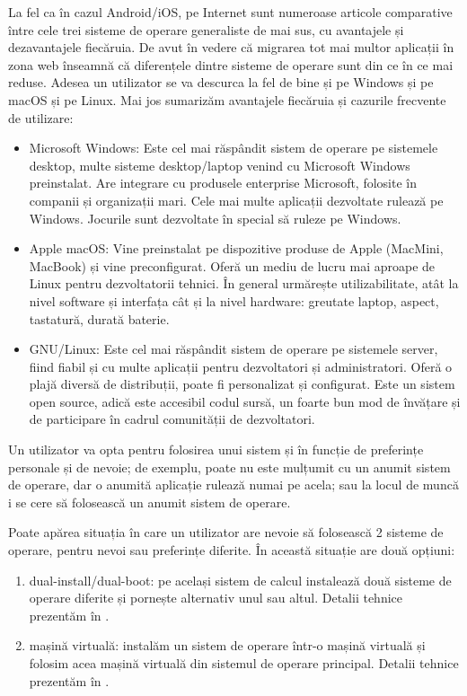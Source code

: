 La fel ca în cazul Android/iOS, pe Internet sunt numeroase articole comparative între cele trei sisteme de operare generaliste de mai sus, cu avantajele și dezavantajele fiecăruia. De avut în vedere că migrarea tot mai multor aplicații în zona web înseamnă că diferențele dintre sisteme de operare sunt din ce în ce mai reduse. Adesea un utilizator se va descurca la fel de bine și pe Windows și pe macOS și pe Linux. Mai jos sumarizăm avantajele fiecăruia și cazurile frecvente de utilizare:

\begin{itemize}
  \item Microsoft Windows: Este cel mai răspândit sistem de operare pe sistemele desktop, multe sisteme desktop/laptop venind cu Microsoft Windows preinstalat. Are integrare cu produsele enterprise Microsoft, folosite în companii și organizații mari. Cele mai multe aplicații dezvoltate rulează pe Windows. Jocurile sunt dezvoltate în special să ruleze pe Windows.
  \item Apple macOS: Vine preinstalat pe dispozitive produse de Apple (MacMini, MacBook) și vine preconfigurat. Oferă un mediu de lucru mai aproape de Linux pentru dezvoltatorii tehnici. În general urmărește utilizabilitate, atât la nivel software și interfața cât și la nivel hardware: greutate laptop, aspect, tastatură, durată baterie.
  \item GNU/Linux: Este cel mai răspândit sistem de operare pe sistemele server, fiind fiabil și cu multe aplicații pentru dezvoltatori și administratori. Oferă o plajă diversă de distribuții, poate fi personalizat și configurat. Este un sistem open source, adică este accesibil codul sursă, un foarte bun mod de învățare și de participare în cadrul comunității de dezvoltatori.
\end{itemize}

Un utilizator va opta pentru folosirea unui sistem și în funcție de preferințe personale și de nevoie; de exemplu, poate nu este mulțumit cu un anumit sistem de operare, dar o anumită aplicație rulează numai pe acela; sau la locul de muncă i se cere să folosească un anumit sistem de operare.

Poate apărea situația în care un utilizator are nevoie să folosească 2 sisteme de operare, pentru nevoi sau preferințe diferite. În această situație are două opțiuni:

\begin{enumerate}
  \item dual-install/dual-boot: pe același sistem de calcul instalează două sisteme de operare diferite și pornește alternativ unul sau altul. Detalii tehnice prezentăm în .
  \item mașină virtuală: instalăm un sistem de operare într-o mașină virtuală și folosim acea mașină virtuală din sistemul de operare principal. Detalii tehnice prezentăm în .
\end{enumerate}


